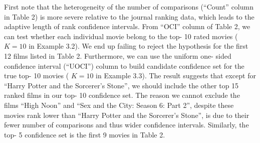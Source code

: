 First note that the heterogeneity of the number of comparisons
(``Count'' column in Table 2) is more severe relative to the journal
ranking data, which leads to the adaptive length of rank confidence
intervals. From ``OCI'' column of Table 2, we can test whether each
individual movie belong to the top- 10 rated movies ( \(K = 10\) in
Example 3.2). We end up failing to reject the hypothesis for the first
12 films listed in Table 2. Furthermore, we can use the uniform one-
sided confidence interval (``UOCI'') column to build candidate
confidence set for the true top- 10 movies ( \(K = 10\) in Example 3.3).
The result suggests that except for ``Harry Potter and the Sorcerer's
Stone'', we should include the other top 15 ranked films in our top- 10
confidence set. The reason we cannot exclude the films ``High Noon'' and
``Sex and the City: Season 6: Part 2'', despite these movies rank lower
than ``Harry Potter and the Sorcerer's Stone'', is due to their fewer
number of comparisons and thus wider confidence intervals. Similarly,
the top- 5 confidence set is the first 9 movies in Table 2.

